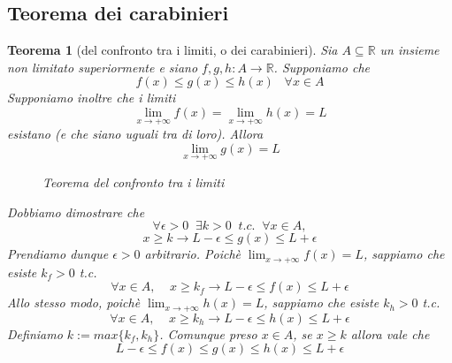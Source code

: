 \documentclass[a4paper]{article}
\newtheorem{theorem}{Teorema}
\theoremstyle{break}
\theoremstyle{break}
\theoremstyle{break}
\theoremstyle{break}
\begin{document}
\subsection{Teorema dei carabinieri}
\begin{theorem}[del confronto tra i limiti, o dei carabinieri]
  Sia \( A \subseteq \mathbb{R} \) un insieme non limitato superiormente e siano
  \( f,g,h: A \to \mathbb{R} \). Supponiamo che
  \[
    f(x) \le g(x) \le h(x)\;\;\;\forall x \in A
  \]
  Supponiamo inoltre che i limiti
  \[
    \lim_{x \to +\infty} f(x) = \lim_{x \to +\infty} h(x) = L
  \]
  esistano (e che siano uguali tra di loro). Allora
  \[
    \lim_{x \to +\infty} g(x) = L
  \]
  \begin{figure}[H]
    \begin{center}
    \end{center}
    \caption{Teorema del confronto tra i limiti}
  \end{figure}
  Dobbiamo dimostrare che
  \[
    \forall \epsilon > 0\;\; \exists k>0\; \;t.c.\;\; \forall x \in A,
  \]
  \[
    x \ge k \to L-\epsilon \le g(x) \le L+\epsilon
  \]
  Prendiamo dunque \( \epsilon>0 \) arbitrario. Poichè \( \lim_{x \to +\infty} f(x)=L\),
  sappiamo che esiste \( k_f >0 \) t.c.
  \[
    \forall x \in A,\;\;\;\; x \ge k_f \to L-\epsilon \le f(x) \le L+\epsilon
  \]
  Allo stesso modo, poichè \( \lim_{x \to +\infty} h(x)=L\),
  sappiamo che esiste \( k_h >0 \) t.c.
  \[
    \forall x \in A,\;\;\;\; x \ge k_h \to L-\epsilon \le h(x) \le L+\epsilon
  \]
  Definiamo \( k:= max\{k_f,k_h\} \). Comunque preso \( x \in A \),
  se \( x \ge k \) allora vale che
  \[
    L-\epsilon \le f(x) \le g(x) \le h(x) \le L+\epsilon
  \]

\end{theorem}
\end{document}
